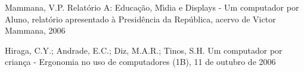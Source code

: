 \documentclass[
12pt,		%
openright,	%
twoside,  %
a4paper,			%
chapter=TITLE,		%
english,			%
french,				%
spanish,			%
brazil				%
]{USPSC-classe/USPSC}
\begin{document}
\begin{flushleft}
\begin{flushleft}
\begin{flushleft}
\begin{flushleft}
\begin{flushleft}
\begin{flushleft}
\begin{flushleft}
\begin{flushleft}
\begin{flushleft}
[MAMMANA, 2006] Mammana, V.P. Relat\'orio A: Educa\c{c}\~ao, M\'{\i}dia e Displays - Um computador por Aluno, relat\'orio apresentado \`a Presid\^encia da Rep\'ublica, acervo de Victor Mammana, 2006
\end{flushleft}


\end{flushleft}


\end{flushleft}


\end{flushleft}


\end{flushleft}


\end{flushleft}


\end{flushleft}


\end{flushleft}


\end{flushleft}


\begin{flushleft}
\begin{flushleft}
\begin{flushleft}
\begin{flushleft}
\begin{flushleft}
\begin{flushleft}
\begin{flushleft}
\begin{flushleft}
\begin{flushleft}
[HIRAGA et al., 2006] Hiraga, C.Y.; Andrade, E.C.; Diz, M.A.R.; Tinos, S.H. Um computador por crian\c{c}a - Ergonomia no uso de computadores (1B), 11 de outubro de 2006
\end{flushleft}


\end{flushleft}


\end{flushleft}


\end{flushleft}


\end{flushleft}


\end{flushleft}


\end{flushleft}


\end{flushleft}


\end{flushleft}
\end{document}
